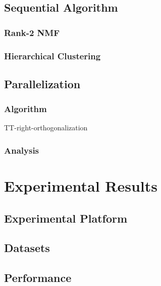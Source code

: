 \documentclass[conference,compsoc]{IEEEtran}
\begin{document}
\subsection{Sequential Algorithm}

\subsubsection{Rank-2 NMF}

\subsubsection{Hierarchical Clustering}

\subsection{Parallelization}

\subsubsection{Algorithm}

\begin{algorithm}
\caption{TT-right-orthogonalization}
\label{alg:parrank2nmf}
\begin{algorithmic}[1]
	\Require{}
	\Ensure{}
		\State
	\EndFunction
\end{algorithmic}
\end{algorithm}

\subsubsection{Analysis}

\section{Experimental Results}

\subsection{Experimental Platform}

\subsection{Datasets}

\subsection{Performance}
\end{document}
